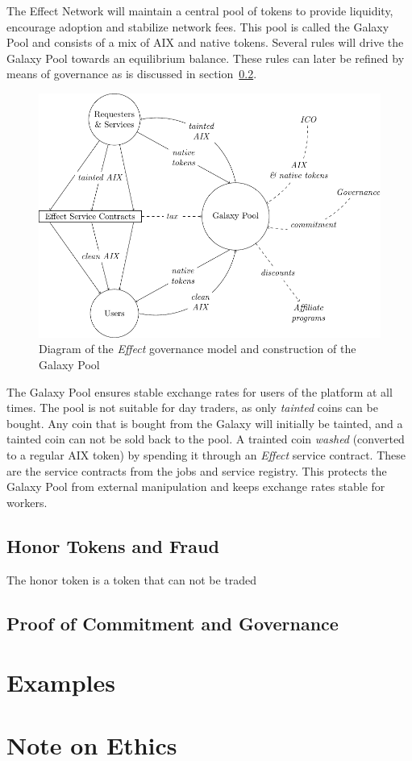 \documentclass{article}
\begin{document}
The Effect Network will maintain a central pool of tokens to provide
liquidity, encourage adoption and stabilize network fees. This pool is
called the Galaxy Pool and consists of a mix of AIX and native
tokens. Several rules will drive the Galaxy Pool towards an
equilibrium balance. These rules can later be refined by means of
governance as is discussed in section~\ref{sec:governance}.

\begin{figure}[htb]
  \includegraphics[width=\textwidth]{pictures/galaxy.pdf}
  \caption{Diagram of the \emph{Effect} governance model and
    construction of the Galaxy Pool}
\end{figure}

The Galaxy Pool ensures stable exchange rates for users of the
platform at all times. The pool is not suitable for day traders, as
only \emph{tainted} coins can be bought. Any coin that is bought from
the Galaxy will initially be tainted, and a tainted coin can not be
sold back to the pool. A trainted coin \emph{washed} (converted to a
regular AIX token) by spending it through an \emph{Effect} service
contract. These are the service contracts from the jobs and service
registry. This protects the Galaxy Pool from external manipulation and
keeps exchange rates stable for workers.

\subsection{Honor Tokens and Fraud}
The honor token is a token that can not be traded


\subsection{Proof of Commitment and Governance}
\label{sec:governance}

\section{Examples}

\section{Note on Ethics}
\end{document}
